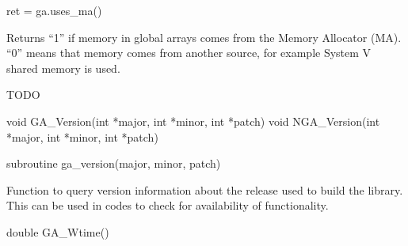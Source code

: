 \documentclass[12pt]{article}
\begin{document}
\begin{pyapi}
\begin{pycode}
ret = ga.uses_ma()
\end{pycode}
\end{pyapi}

\local

\begin{desc}

Returns ``1'' if memory in global arrays comes from the Memory Allocator (MA).
``0'' means that memory comes from another source, for example System V shared
memory is used.

TODO

\end{desc}


\begin{capi}
\begin{ccode}
void GA_Version(int *major, int *minor, int *patch)
void NGA_Version(int *major, int *minor, int *patch)
\end{ccode}
\begin{funcargs}
\end{funcargs}
\end{capi}

\begin{fapi}
\begin{fcode}
subroutine ga_version(major, minor, patch)
\end{fcode}
\begin{funcargs}
\end{funcargs}
\end{fapi}

\local

\begin{desc}
Function to query version information about the release used to build the
library. This can be used in codes to check for availability of functionality.
\end{desc}


\begin{capi}
\begin{ccode}
double GA_Wtime()
\end{ccode}
\end{capi}
\end{document}
